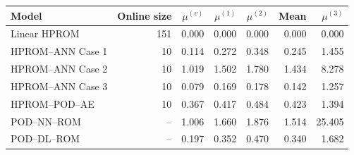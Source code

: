 \begin{tabular}{lr|rrrr|r}
\toprule
Model & Online size & $\mu^{(v)}$ & $\mu^{(1)}$ & $\mu^{(2)}$ & Mean & $\mu^{(3)}$ \\
\midrule
Linear HPROM & 151 & 0.000 & 0.000 & 0.000 & 0.000 & 0.000 \\
HPROM--ANN Case 1 & 10 & 0.114 & 0.272 & 0.348 & 0.245 & 1.455 \\
HPROM--ANN Case 2 & 10 & 1.019 & 1.502 & 1.780 & 1.434 & 8.278 \\
HPROM--ANN Case 3 & 10 & 0.079 & 0.169 & 0.178 & 0.142 & 1.257 \\
HPROM--POD--AE & 10 & 0.367 & 0.417 & 0.484 & 0.423 & 1.394 \\
\midrule
POD--NN--ROM & -- & 1.006 & 1.660 & 1.876 & 1.514 & 25.405 \\
POD--DL--ROM & -- & 0.197 & 0.352 & 0.470 & 0.340 & 1.682 \\
\bottomrule
\end{tabular}
